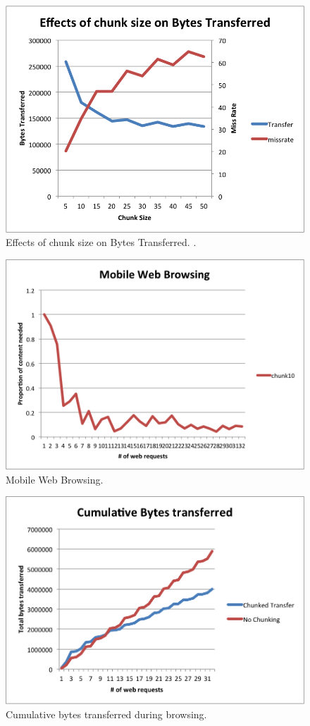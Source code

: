 \begin{figure}[h] 
\centering \includegraphics[width=\columnwidth]{images/chunksize2.png}
\caption{Effects of chunk size on Bytes Transferred. .}
\end{figure}
\begin{figure}[h] 
\centering \includegraphics[width=\columnwidth]{images/browsing.png}
\caption{Mobile Web Browsing. }
\end{figure}
\begin{figure}[h] 
\centering \includegraphics[width=\columnwidth]{images/cumulbrowsing.png}
\caption{Cumulative bytes transferred during browsing. }
\end{figure}
